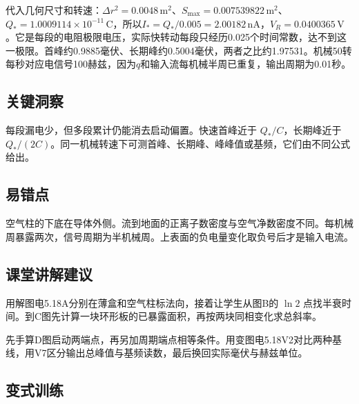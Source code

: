 \documentclass[UTF8,fontset=fandol,a4paper,11pt]{ctexart}
\begin{document}
代入几何尺寸和转速：$\Delta r^2=0.0048\,\mathrm{m^2}$、$S_{\max}=0.007539822\,\mathrm{m^2}$、$Q_*=1.0009114\times10^{-11}\,\mathrm C$，所以$I_*=Q_*/0.005=2.00182\,\mathrm{nA}$，$V_R=0.0400365\,\mathrm V$。它是每段的电阻极限电压，实际快转动每段只经历0.025个时间常数，达不到这一极限。首峰约0.9885毫伏、长期峰约0.5004毫伏，两者之比约1.97531。机械50转每秒对应电信号100赫兹，因为$q$和输入流每机械半周已重复，输出周期为0.01秒。




\subsection*{关键洞察}

每段漏电少，但多段累计仍能消去启动偏置。快速首峰近于 $Q_*/C$，长期峰近于 $Q_*/(2C)$。同一机械转速下可测首峰、长期峰、峰峰值或基频，它们由不同公式给出。



\subsection*{易错点}

空气柱的下底在导体外侧。流到地面的正离子数密度与空气净数密度不同。每机械周暴露两次，信号周期为半机械周。上表面的负电量变化取负号后才是输入电流。



\subsection*{课堂讲解建议}

用解图电5.18A分别在薄盒和空气柱标法向，接着让学生从图B的 $\ln2$ 点找半衰时间。到C图先计算一块环形板的已暴露面积，再按两块同相变化求总斜率。

先手算D图启动两端点，再另加周期端点相等条件。用变图电5.18V2对比两种基线，用V7区分输出总峰值与基频读数，最后换回实际毫伏与赫兹单位。


\subsection*{变式训练}
\end{document}
